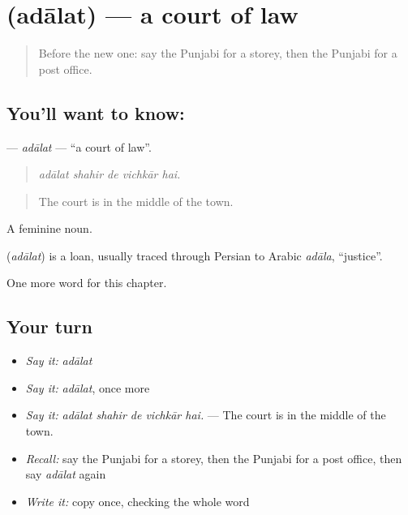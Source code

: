 \section[\texorpdfstring{\pa{ਅਦਾਲਤ} (adālat)}{ਅਦਾਲਤ (adālat)}]{ (adālat) — a court of law}

\label{lesson:PA-C267-adalat}



\begin{quote}
Before the new one: say the Punjabi for a storey, then the Punjabi for a post office.
\end{quote}

\subsection*{You'll want to know: }
\textbf{} — \emph{adālat} — \textquotedblleft{}a court of law\textquotedblright{}.

\begin{quote}
    
\end{quote}

\begin{quote}
\emph{adālat shahir de vichkār hai.}
\end{quote}

\begin{quote}
The court is in the middle of the town.
\end{quote}

A feminine noun.

\begin{cousinweb}
\textbf{} (\emph{adālat}) is a loan, usually traced through Persian to Arabic \emph{adāla}, \textquotedblleft{}justice\textquotedblright{}.
\end{cousinweb}

\begin{grammarlens}[title={What you've built}]
One more word for this chapter.
\end{grammarlens}

\subsection*{Your turn}
\begin{itemize}
\raggedright
  \item \emph{Say it:} \emph{adālat}
  \item \emph{Say it:} \emph{adālat}, once more
  \item \emph{Say it:} \emph{adālat shahir de vichkār hai.} — The court is in the middle of the town.
  \item \emph{Recall:} say the Punjabi for a storey, then the Punjabi for a post office, then say \emph{adālat} again
  \item \emph{Write it:} copy \textbf{} once, checking the whole word
\end{itemize}

